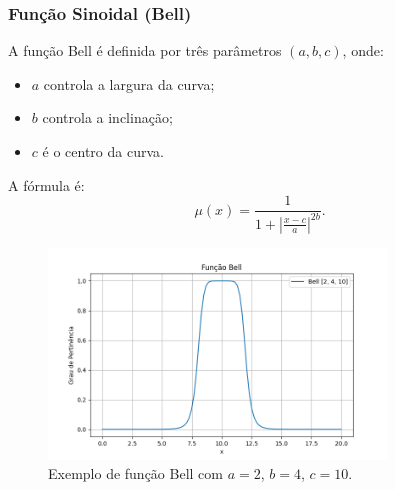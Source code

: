 \documentclass[a4paper,12pt]{article}
\begin{document}
\subsubsection{Função Sinoidal (Bell)}
A função Bell é definida por três parâmetros $(a, b, c)$, onde:
\begin{itemize}
    \item $a$ controla a largura da curva;
    \item $b$ controla a inclinação;
    \item $c$ é o centro da curva.
\end{itemize}
A fórmula é:
\[
\mu(x) = \frac{1}{1 + \left|\frac{x - c}{a}\right|^{2b}}.
\]
\begin{figure}[H]
    \centering
    \includegraphics[width=0.8\textwidth]{img/bell.png}
    \caption{Exemplo de função Bell com $a=2$, $b=4$, $c=10$.}
\end{figure}
\end{document}
